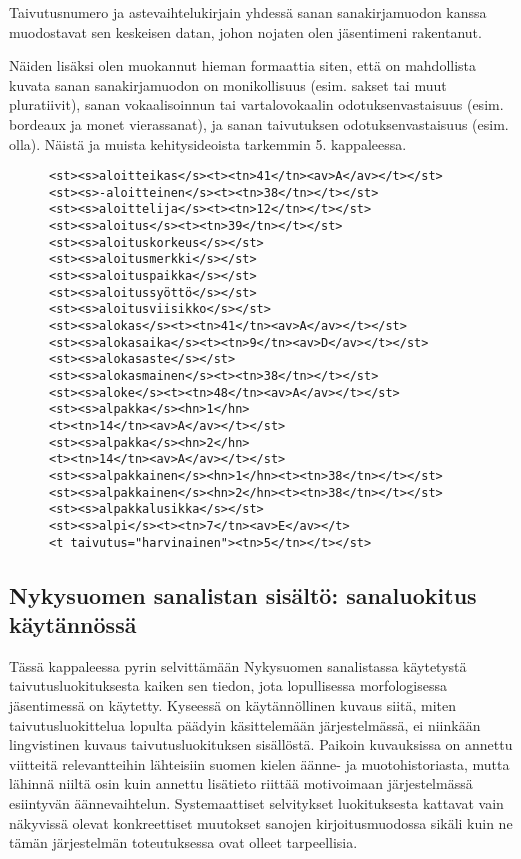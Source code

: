 \documentclass[free]{flammie}
\begin{document}
Taivutusnumero ja astevaihtelukirjain yhdessä sanan sanakirjamuodon kanssa
muodostavat sen keskeisen datan, johon nojaten olen jäsentimeni rakentanut.

Näiden lisäksi olen muokannut hieman formaattia siten, että on mahdollista kuvata sanan sanakirjamuodon on monikollisuus (esim. sakset tai muut pluratiivit),
sanan vokaalisoinnun tai vartalovokaalin odotuksenvastaisuus (esim. bordeaux ja
monet vierassanat), ja sanan taivutuksen odotuksenvastaisuus (esim. olla). Näistä
ja muista kehitysideoista tarkemmin 5. kappaleessa.


\begin{figure}
    \label{Otos Nykysuomen sanalistan XML-datasta (Kotimaisten Kielten
    Tutkimuskeskus, 2006)}
    \begin{verbatim}
<st><s>aloitteikas</s><t><tn>41</tn><av>A</av></t></st>
<st><s>-aloitteinen</s><t><tn>38</tn></t></st>
<st><s>aloittelija</s><t><tn>12</tn></t></st>
<st><s>aloitus</s><t><tn>39</tn></t></st>
<st><s>aloituskorkeus</s></st>
<st><s>aloitusmerkki</s></st>
<st><s>aloituspaikka</s></st>
<st><s>aloitussyöttö</s></st>
<st><s>aloitusviisikko</s></st>
<st><s>alokas</s><t><tn>41</tn><av>A</av></t></st>
<st><s>alokasaika</s><t><tn>9</tn><av>D</av></t></st>
<st><s>alokasaste</s></st>
<st><s>alokasmainen</s><t><tn>38</tn></t></st>
<st><s>aloke</s><t><tn>48</tn><av>A</av></t></st>
<st><s>alpakka</s><hn>1</hn>
<t><tn>14</tn><av>A</av></t></st>
<st><s>alpakka</s><hn>2</hn>
<t><tn>14</tn><av>A</av></t></st>
<st><s>alpakkainen</s><hn>1</hn><t><tn>38</tn></t></st>
<st><s>alpakkainen</s><hn>2</hn><t><tn>38</tn></t></st>
<st><s>alpakkalusikka</s></st>
<st><s>alpi</s><t><tn>7</tn><av>E</av></t>
<t taivutus="harvinainen"><tn>5</tn></t></st>
    \end{verbatim}
\end{figure}


\subsection{Nykysuomen sanalistan sisältö: sanaluokitus käytännössä}

Tässä kappaleessa pyrin selvittämään Nykysuomen sanalistassa käytetystä taivutusluokituksesta kaiken sen tiedon, jota lopullisessa morfologisessa jäsentimessä
on käytetty. Kyseessä on käytännöllinen kuvaus siitä, miten taivutusluokittelua
lopulta päädyin käsittelemään järjestelmässä, ei niinkään lingvistinen kuvaus taivutusluokituksen sisällöstä. Paikoin kuvauksissa on annettu viitteitä relevantteihin lähteisiin suomen kielen äänne- ja muotohistoriasta, mutta lähinnä niiltä osin
kuin annettu lisätieto riittää motivoimaan järjestelmässä esiintyvän äännevaihtelun. Systemaattiset selvitykset luokituksesta kattavat vain näkyvissä olevat konkreettiset muutokset sanojen kirjoitusmuodossa sikäli kuin ne tämän järjestelmän
toteutuksessa ovat olleet tarpeellisia.
\end{document}
